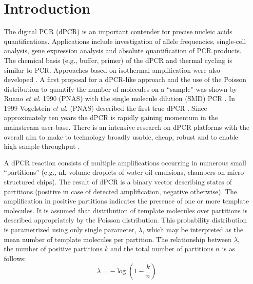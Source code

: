 \documentclass[a4,center,fleqn]{NAR}
\begin{document}
\section{Introduction}
The digital PCR (dPCR) is an important contender for precise nucleic acids 
quantifications. Applications include investigation of allele frequencies, 
single-cell analysis, gene expression analysis and absolute quantification of 
PCR products. The chemical basis (e.g., buffer, primer) of the dPCR and thermal 
cycling is similar to PCR.  Approaches based on isothermal amplification were 
also developed \cite{pabinger_survey_2014, ludlow_2014, rodiger_r_2015}. A first 
proposal for a dPCR-like approach and the use of the Poisson distribution to 
quantify the number of molecules on a ``sample'' was shown by Ruano \textit{et 
al.} 1990 (PNAS) with the single molecule dilution (SMD) PCR 
\cite{ruano_haplotype_1990}. In 1999 Vogelstein \textit{et al.} (PNAS) described 
the first true dPCR \cite{vogelstein_digital_1999}. Since approximately ten 
years the dPCR is rapidly gaining momentum in the mainstream user-base. There is an intensive 
research on dPCR platforms with the overall aim to make to technology broadly 
usable, cheap, robust and to enable high sample throughput 
\cite{selck_increased_2013, huggett_qpcr_2015, morley_digital_2014}. 

\enlargethispage{-65.1pt}

A dPCR reaction consists of multiple amplifications occurring in 
numerous small ``partitions'' (e.g., nL volume droplets of water oil 
emulsions, chambers on micro structured chips). The result of dPCR is a binary 
vector describing states of partitions (positive in case of detected 
amplification, negative otherwise). The amplification in positive partitions 
indicates the presence of one or more template molecules. It is assumed that 
distribution of template molecules over partitions is described appropriately 
by the Poisson distribution. This probability distribution is parametrized 
using only single parameter, $\lambda$, which may be interpreted as the mean 
number of template molecules per partition. The relationship between 
$\lambda$, the number of positive partitions $k$ and the total number of 
partitions $n$ is as follows:
\begin{equation}
 \lambda = -\log{\left( 1 - \frac{k}{n} \right)}
 \label{lambda_kn}
\end{equation}
\end{document}
